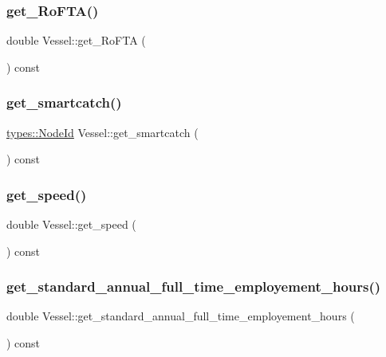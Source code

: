 \mbox{\label{class_vessel_af7f09d52d3945e210feea4951af5758b}} 
\subsubsection{\texorpdfstring{get\_RoFTA()}{get\_RoFTA()}}
{\footnotesize\ttfamily double Vessel\+::get\+\_\+\+Ro\+F\+TA (\begin{DoxyParamCaption}{ }\end{DoxyParamCaption}) const}

\mbox{\label{class_vessel_a27dcc764a866ae042b2b53a079f56970}} 
\subsubsection{\texorpdfstring{get\_smartcatch()}{get\_smartcatch()}}
{\footnotesize\ttfamily \mbox{\hyperlink{classtypes_1_1_node_id}{types\+::\+Node\+Id}} Vessel\+::get\+\_\+smartcatch (\begin{DoxyParamCaption}{ }\end{DoxyParamCaption}) const}

\mbox{\label{class_vessel_a9a1749304d3d357563785cc4094d261a}} 
\subsubsection{\texorpdfstring{get\_speed()}{get\_speed()}}
{\footnotesize\ttfamily double Vessel\+::get\+\_\+speed (\begin{DoxyParamCaption}{ }\end{DoxyParamCaption}) const}

\mbox{\label{class_vessel_a6e0573dda6e7a9dfec0f4ac5d83fb3dc}} 
\subsubsection{\texorpdfstring{get\_standard\_annual\_full\_time\_employement\_hours()}{get\_standard\_annual\_full\_time\_employement\_hours()}}
{\footnotesize\ttfamily double Vessel\+::get\+\_\+standard\+\_\+annual\+\_\+full\+\_\+time\+\_\+employement\+\_\+hours (\begin{DoxyParamCaption}{ }\end{DoxyParamCaption}) const}

